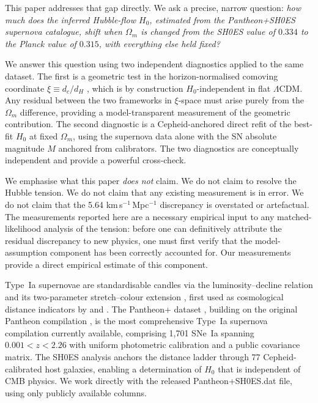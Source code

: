 \documentclass[fleqn,usenatbib,useAMS]{mnras}
\begin{document}
This paper addresses that gap directly.
We ask a precise, narrow question: \emph{how much does the inferred
Hubble-flow $H_0$, estimated from the Pantheon+SH0ES supernova
catalogue, shift when $\Omega_m$ is changed from the SH0ES value of
$0.334$ to the Planck value of $0.315$, with everything else held
fixed?}

We answer this question using two independent diagnostics applied to
the same dataset.
The first is a geometric test in the horizon-normalised comoving
coordinate $\xi \equiv d_c/d_H$ \citep{martin2026uha}, which is by construction
$H_0$-independent in flat $\Lambda$CDM.
Any residual between the two frameworks in $\xi$-space must arise
purely from the $\Omega_m$ difference, providing a model-transparent
measurement of the geometric contribution.
The second diagnostic is a Cepheid-anchored direct refit of the
best-fit $H_0$ at fixed $\Omega_m$, using the supernova data alone
with the SN absolute magnitude $M$ anchored from calibrators.
The two diagnostics are conceptually independent and provide a
powerful cross-check.

We emphasise what this paper \emph{does not} claim.
We do not claim to resolve the Hubble tension.
We do not claim that any existing measurement is in error.
We do not claim that the 5.64 km\,s$^{-1}$\,Mpc$^{-1}$ discrepancy is
overstated or artefactual.
The measurements reported here are a necessary empirical input to
any matched-likelihood analysis of the tension: before one can
definitively attribute the residual discrepancy to new physics,
one must first verify that the model-assumption component has been
correctly accounted for.
Our measurements provide a direct empirical estimate of this component.

Type~Ia supernovae are standardisable candles via the luminosity--decline
relation \citep{phillips1993} and its two-parameter stretch--colour
extension \citep{tripp1998}, first used as cosmological distance
indicators by \citet{riess1998} and \citet{perlmutter1999}.
The Pantheon+ dataset \citep{scolnic2022,brout2022}, building on the
original Pantheon compilation \citep{scolnic2018}, is the most
comprehensive Type~Ia supernova compilation currently available,
comprising 1{,}701 SNe~Ia spanning $0.001 < z < 2.26$ with
uniform photometric calibration and a public covariance matrix.
The SH0ES analysis \citep{riess2022} anchors the distance ladder
through 77 Cepheid-calibrated host galaxies, enabling a determination
of $H_0$ that is independent of CMB physics.
We work directly with the released Pantheon+SH0ES.dat file,
using only publicly available columns.
\end{document}
